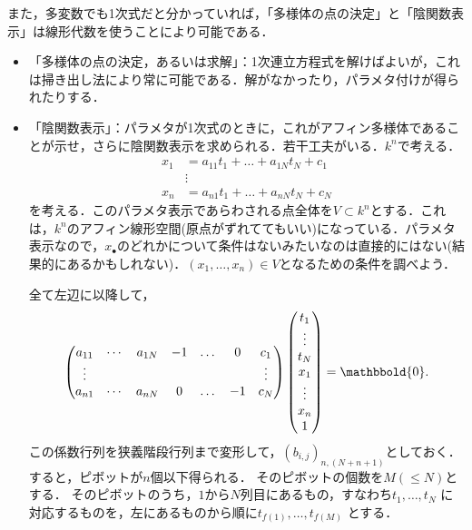 \documentclass[9pt]{ltjsarticle}
\newcommand{\bbold}{\mathbbold}
\theoremstyle{break}
\theoremstyle{break}
\theoremstyle{break}
\theoremstyle{break}
\theoremstyle{break}
\theoremstyle{break}
\theoremstyle{break}
\theoremstyle{break}
\theoremstyle{break}
\theoremstyle{break}
\theoremstyle{break}
\theoremstyle{break}
\theoremstyle{break}
\theoremstyle{break}
\theoremstyle{break}
\theoremstyle{nonumberbreak}
\theoremstyle{nonumberbreak}
\begin{document}
また，多変数でも1次式だと分かっていれば，「多様体の点の決定」と「陰関数表示」は線形代数を使うことにより可能である．
\begin{itemize}
 \item 「多様体の点の決定，あるいは求解」：1次連立方程式を解けばよいが，これは掃き出し法により常に可能である．解がなかったり，パラメタ付けが得られたりする．
 \item 「陰関数表示」：パラメタが1次式のときに，これがアフィン多様体であることが示せ，さらに陰関数表示を求められる．若干工夫がいる．$k^n$で考える．
\begin{align}
 x_1 &=  a_{11} t_1 + \dots + a_{1N}t_N + c_1\\
 & \vdots\\
 x_n & = a_{n1} t_1 + \dots + a_{nN}t_N + c_N
\end{align}
を考える．このパラメタ表示であらわされる点全体を$V\subset k^n$とする．これは，$k^n$のアフィン線形空間(原点がずれててもいい)になっている．パラメタ表示なので，$x_\bullet$のどれかについて条件はないみたいなのは直接的にはない(結果的にあるかもしれない)．$(x_1,\dots,x_n)\in V$となるための条件を調べよう．

全て左辺に以降して，
\begin{align}
\begin{pmatrix}
 a_{11} & \cdots & a_{1N} & -1 & \dots & 0 & c_1\\
 \vdots& & & & & & \vdots\\
 a_{n1} & \cdots & a_{nN} & 0 & \dots & -1 & c_N
\end{pmatrix}
\tatev{t_1 \\ \vdots \\ t_N \\ x_1 \\ \vdots \\ x_n \\ 1}
 =
\bbold{0}.
\end{align}
この係数行列を狭義階段行列まで変形して，$(b_{i,j})_{n,(N+n+1)}$としておく．すると，ピボットが$n$個以下得られる．
そのピボットの個数を$M(\le N)$とする．
そのピボットのうち，$1$から$N$列目にあるもの，すなわち$t_1,\dots,t_N$
に対応するものを，左にあるものから順に$t_{f(1)},\dots, t_{f(M)}$       とする．


\end{itemize}
\end{document}
